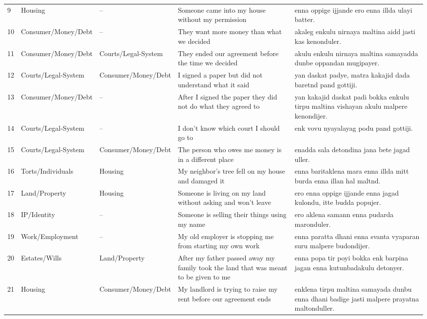 \documentclass[11pt]{article}
\begin{document}
\begin{longtable}{p{} p{} p{} p{} p{}}
9 & Housing & -- & Someone came into my house without my permission & enna oppige ijjande ero enna illda ulayi batter. \\
10 & Consumer/\allowbreak Money/\allowbreak Debt & -- & They want more money than what we decided & akaleg enkulu nirnaya maltina aidd jasti kas kenonduler. \\
11 & Consumer/\allowbreak Money/\allowbreak Debt & Courts/\allowbreak Legal-System & They ended our agreement before the time we decided & akulu enkulu nirnaya maltina samayadda dunbe oppandan mugipayer. \\
12 & Courts/\allowbreak Legal-System & Consumer/\allowbreak Money/\allowbreak Debt & I signed a paper but did not understand what it said & yan daskat padye, matra kakajid dada baretnd pand gottiji. \\
13 & Consumer/\allowbreak Money/\allowbreak Debt & -- & After I signed the paper they did not do what they agreed to & yan kakajid daskat padi bokka enkulu tirpu maltina vishayan akulu malpere kenondijer. \\
14 & Courts/\allowbreak Legal-System & -- & I don't know which court I should go to & enk vovu nyayalayag podu pand gottiji. \\
15 & Courts/\allowbreak Legal-System & Consumer/\allowbreak Money/\allowbreak Debt & The person who owes me money is in a different place & enadda sala detondina jana bete jagad uller. \\
16 & Torts/\allowbreak Individuals & Housing & My neighbor's tree fell on my house and damaged it & enna baritaklena mara enna illda mitt burda enna illan hal maltnd. \\
17 & Land/\allowbreak Property & Housing & Someone is living on my land without asking and won't leave & ero enna oppige ijjande enna jagad kulondu, itte budda popujer. \\
18 & IP/\allowbreak Identity & -- & Someone is selling their things using my name & ero aklena samann enna pudarda maronduler. \\
19 & Work/\allowbreak Employment & -- & My old employer is stopping me from starting my own work & enna paratta dhani enna svanta vyaparan suru malpere budondijer. \\
20 & Estates/\allowbreak Wills & Land/\allowbreak Property & After my father passed away my family took the land that was meant to be given to me & enna popa tir poyi bokka enk barpina jagan enna kutunbadakulu detonyer. \\
21 & Housing & Consumer/\allowbreak Money/\allowbreak Debt & My landlord is trying to raise my rent before our agreement ends & enklena tirpu maltina samayada dunbu enna dhani badige jasti malpere prayatna maltonduller. \\

\end{longtable}
\end{document}
